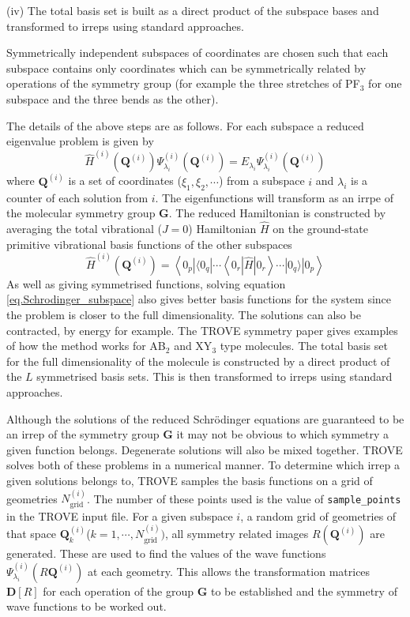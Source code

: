 (iv) The total basis set is built as a direct product of the subspace bases and transformed to irreps using standard approaches.

Symmetrically independent subspaces of coordinates are chosen such that each subspace contains only coordinates which can be
symmetrically related by operations of the symmetry group (for example the three stretches of PF$_3$ for one subspace and the
three bends as the other). 

The details of the above steps are as follows. For each subspace a reduced eigenvalue problem is given by
\begin{equation}
\label{eq.Schrodinger_subspace}
\hat{H}^{(i)}(\mathbf{Q}^{(i)})\Psi^{(i)}_{\lambda_i}(\mathbf{Q}^{(i)}) = E_{\lambda_i}\Psi^{(i)}_{\lambda_i}(\mathbf{Q}^{(i)})
\end{equation}
where $\mathbf{Q}^{(i)}$ is a set of coordinates ($\xi_1,\xi_2,\cdots$) from a subspace $i$ and $\lambda_i$ is a counter
of each solution from $i$. The eigenfunctions will transform as an irrpe of the molecular symmetry group $\mathbf{G}$. The 
reduced Hamiltonian is constructed by averaging the total vibrational ($J=0$) Hamiltonian $\hat{H}$ on the 
ground-state primitive vibrational basis functions of the other subspaces
\begin{equation}
\label{eq.reduced_H}
\hat{H}^{(i)}(\mathbf{Q}^{(i)}) = \left< 0_p| \langle 0_q | \cdots \left<0_r|\hat{H}|0_r \right> \cdots |0_q \rangle |0_p
 \right>
\end{equation}
As well as giving symmetrised functions, solving equation \ref{eq.Schrodinger_subspace} also gives better basis functions
for the system since the problem is closer to the full dimensionality. The solutions can also be contracted, by energy for
example. The TROVE symmetry paper gives examples of how the method works for AB$_2$ and XY$_3$ type molecules. 
The total basis set for the full dimensionality of the molecule is constructed by a direct product of the $L$
symmetrised basis sets. This is then transformed to irreps using standard approaches. 

Although the solutions of the reduced Schr\"odinger equations are guaranteed to be an irrep of the symmetry group $\mathbf{G}$ 
it may not be obvious to which symmetry
a given function belongs. Degenerate solutions will also be mixed together. TROVE solves both of these problems in a 
numerical manner. To determine which irrep a given solutions belongs to, TROVE samples the basis functions on a grid of
geometries $N^{(i)}_{\text{grid}}$. The number of these points used is the value of \verb|sample_points| in the TROVE input file.
For a given subspace $i$, a random grid of geometries of that space 
$\mathbf{Q}_k^{(i)}$($k=1,\cdots,N^{(i)}_{\text{grid}})$, all
symmetry related images $R (\mathbf{Q}^{(i)})$ are generated. These are used to find the values of the wave functions 
$\Psi^{(i)}_{\lambda_i}(R \mathbf{Q}^{(i)})$ at each geometry. This allows the transformation matrices $\mathbf{D}[R]$ for 
each operation of the group $\mathbf{G}$ to be established and the symmetry of wave functions to be worked out.

